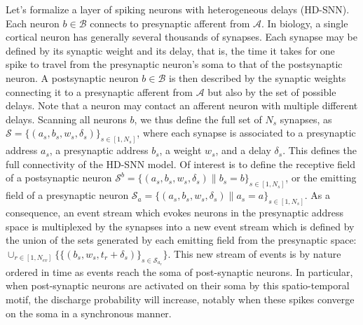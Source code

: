 \documentclass[runningheads]{llncs}
\newcommand{\presynaddr}{a} %
\newcommand{\postsynaddr}{b} %
\newcommand{\numevent}{N_{ev}} %
\newcommand{\presynaddrspace}{\mathcal{A}} %
\newcommand{\postsynaddrspace}{\mathcal{B}} %
\newcommand{\arank}{r} %
\newcommand{\synapse}{\mathcal{S}} %
\newcommand{\synapticweight}{w} %
\newcommand{\synapticdelay}{\delta} %
\newcommand{\ranksyn}{s} %
\newcommand{\Nsyn}{N_{s}} %
\newcommand{\timev}{t} %
\begin{document}
Let's formalize a layer of spiking neurons with heterogeneous delays (HD-SNN). Each neuron $\postsynaddr \in \postsynaddrspace$  connects to presynaptic afferent from $\presynaddrspace$. In biology, a single cortical neuron has generally several thousands of synapses. Each synapse may be defined by its synaptic weight and its delay, that is, the time it takes for one spike to travel from the presynaptic neuron's soma to that of the postsynaptic neuron. A postsynaptic neuron $\postsynaddr \in \postsynaddrspace$ is then described by the synaptic weights connecting it to a presynaptic afferent from $\presynaddrspace$ but also by the set of possible delays. Note that a neuron may contact an afferent neuron with multiple different delays. Scanning all neurons $\postsynaddr$, we thus define the full set of $\Nsyn$ synapses, 
as  $\synapse = \{(\presynaddr_\ranksyn, \postsynaddr_\ranksyn, \synapticweight_\ranksyn, \synapticdelay_\ranksyn)\}_{\ranksyn \in [1,\Nsyn]}$, where each synapse is associated to a presynaptic address $\presynaddr_\ranksyn$, a presynaptic address $\postsynaddr_\ranksyn$,  a weight $\synapticweight_\ranksyn$, and a delay $\synapticdelay_\ranksyn$. This defines the full connectivity of the HD-SNN model. Of interest is to define the receptive field of a postsynaptic neuron $\synapse^\postsynaddr =  \{(\presynaddr_\ranksyn, \postsynaddr_\ranksyn, \synapticweight_\ranksyn, \synapticdelay_\ranksyn) \| \postsynaddr_\ranksyn=\postsynaddr\}_{\ranksyn \in [1,\Nsyn]} $, or the emitting field of a presynaptic neuron $\synapse_\presynaddr =  \{(\presynaddr_\ranksyn, \postsynaddr_\ranksyn, \synapticweight_\ranksyn, \synapticdelay_\ranksyn) \| \presynaddr_\ranksyn=\presynaddr\}_{\ranksyn \in [1,\Nsyn]}$. As a consequence, an event stream which evokes neurons in the presynaptic address space is multiplexed by the synapses into a new event stream which is defined by the union of the sets generated by each emitting field from the presynaptic space: 
$ \cup_{\arank \in [1,\numevent]} \{ \{(\postsynaddr_\ranksyn, \synapticweight_\ranksyn, \timev_\arank + \synapticdelay_\ranksyn) \}_{ \ranksyn \in \synapse_{\presynaddr_\arank}} \}$. This new stream of events is by nature ordered in time as events reach the soma of post-synaptic neurons. In particular, when post-synaptic neurons are activated on their soma by this spatio-temporal motif, the discharge probability will increase, notably when these spikes converge on the soma in a synchronous manner. 
\end{document}
